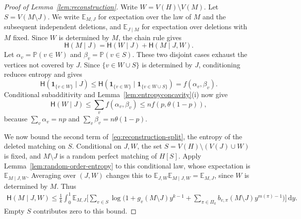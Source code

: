 \documentclass[11pt,reqno]{amsart}
\numberwithin{equation}{section}
\theoremstyle{plain}
\theoremstyle{definition}
\newcommand{\E}{\mathbb E}
\newcommand{\Prob}{\mathbb P}
\newcommand{\HH}{\mathsf H}
\newcommand{\dd}{\,\mathrm d}
\begin{document}
\begin{proof}[Proof of Lemma~\ref{lem:reconstruction}]
    Write $W=V(H)\setminus V(M)$.
    Let $S=V(M\setminus J)$.
    We write $\E_{M,J}$ for expectation over the law of $M$ and the subsequent independent deletions, and $\E_{J\mid M}$ for expectation over deletions with $M$ fixed.
    Since $W$ is determined by $M$, the chain rule gives
    \begin{equation}\label{eq:reconstruction-split}
        \HH(M\mid J)=\HH(W\mid J)+\HH(M\mid J,W).
    \end{equation}
    Let $\alpha_v=\Prob(v\in W)$ and $\beta_v=\Prob(v\in S)$.
    These two disjoint cases exhaust the vertices not covered by $J$.
    Since $\{v\in W\cup S\}$ is determined by $J$, conditioning reduces entropy and gives
    \[
        \HH(\mathbf1_{\{v\in W\}}\mid J)
        \le\HH(\mathbf1_{\{v\in W\}}\mid\mathbf1_{\{v\in W\cup S\}})
        =f(\alpha_v,\beta_v).
    \]
    Conditional subadditivity and Lemma~\ref{lem:entropyconcavity}(i) now give
    \begin{equation}\label{eq:vacancy-classification}
        \HH(W\mid J) \le\sum_v f(\alpha_v,\beta_v) \le nf(p,\theta(1-p)),
    \end{equation}
    because $\sum_v\alpha_v=np$ and $\sum_v\beta_v=n\theta(1-p)$.

    We now bound the second term of~\eqref{eq:reconstruction-split}, the entropy of the deleted matching on $S$.
    Conditional on $J,W$, the set $S=V(H)\setminus(V(J)\cup W)$ is fixed, and $M\setminus J$ is a random perfect matching of $H[S]$.
    Apply Lemma~\ref{lem:random-order-entropy} to this conditional law, whose expectation is $\E_{M\mid J,W}$.
    Averaging over $(J,W)$ changes this to $\E_{J,W}\E_{M\mid J,W}=\E_{M,J}$, since $W$ is determined by $M$.
    Thus
    \begin{equation}\label{eq:deleted-exposure}
        \begin{aligned}
            \HH(M\mid J,W)\le\frac1k\int_0^1\E_{M,J}\Biggl[\sum_{v\in S}
            \log\Biggl(1+g_v(M\setminus J)y^{k-1}+\sum_{\pi\in\Pi_k}b_{v,\pi}(M\setminus J)y^{m(\pi)-1}\Biggr)\Biggr]\dd y.
        \end{aligned}
    \end{equation}
    Empty $S$ contributes zero to this bound.


\end{proof}
\end{document}
